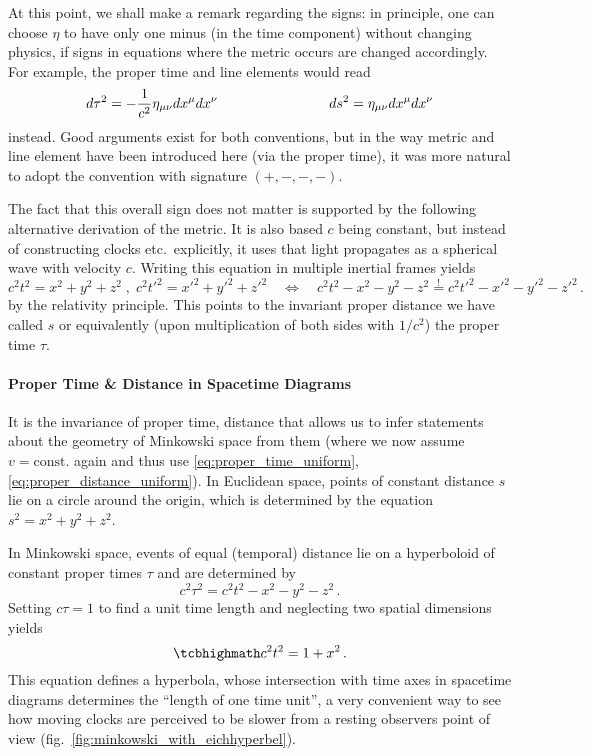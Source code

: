 \documentclass[ART_main.tex]{subfiles}
\begin{document}
At this point, we shall make a remark regarding the signs: in principle, one can choose $\eta$ to have only one minus (in the time component) without changing physics, if signs in equations where the metric occurs are changed accordingly. For example, the proper time and line elements would read
\begin{equation}
	d\tau^2 = - \frac{1}{c^2} \eta_{\mu \nu} dx^\mu dx^\nu
	\qquad \qquad \qquad \qquad
	ds^2 = \eta_{\mu \nu} dx^\mu dx^\nu
\end{equation}
instead. Good arguments exist for both conventions, but in the way metric and line element have been introduced here (via the proper time), it was more natural to adopt the convention with signature $(+, -, -, -)$.

The fact that this overall sign does not matter is supported by the following alternative derivation of the metric. It is also based $c$ being constant, but instead of constructing clocks etc.~explicitly, it uses that light propagates as a spherical wave with velocity $c$. Writing this equation in multiple inertial frames yields
\begin{equation}
	c^2 t^2 = x^2 + y^2 + z^2 \; , \; c^2 t'^2 = x'^2 + y'^2 + z'^2 \quad \Leftrightarrow \quad c^2 t^2 - x^2 - y^2 - z^2 \overset{!}{=} c^2 t'^2 - x'^2 - y'^2 - z'^2 \, .
\end{equation}
by the relativity principle. This points to the invariant proper distance we have called $s$ or equivalently (upon multiplication of both sides with $1 / c^2$) the proper time $\tau$.



			\paragraph{Proper Time \& Distance in Spacetime Diagrams}
It is the invariance of proper time, distance that allows us to infer statements about the geometry of Minkowski space from them (where we now assume $v = \text{const.}$ again and thus use \eqref{eq:proper_time_uniform}, \eqref{eq:proper_distance_uniform}). In Euclidean space, points of constant distance $s$ lie on a circle around the origin, which is determined by the equation $s^2 = x^2 + y^2 + z^2$.

In Minkowski space, events of equal (temporal) distance lie on a hyperboloid of constant proper times $\tau$ and are determined by
\begin{equation*}
	c^2 \tau^2 = c^2 t^2 - x^2 - y^2 - z^2 \, .
\end{equation*}
Setting $c \tau = 1$ to find a unit time length and neglecting two spatial dimensions yields
\begin{equation}
	\eqbox{
	c^2 t^2 = 1 + x^2
	} \, .
\end{equation}
This equation defines a hyperbola, whose intersection with time axes in spacetime diagrams determines the \enquote{length of one time unit}, a very convenient way to see how moving clocks are perceived to be slower from a resting observers point of view (fig.~\ref{fig:minkowski_with_eichhyperbel}).\\
\end{document}
